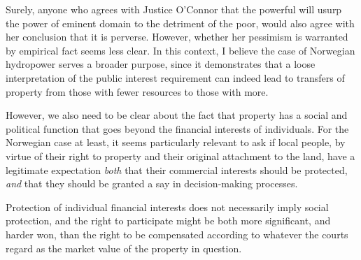{Surely, anyone who agrees with Justice O'Connor that the powerful will usurp the power of eminent domain to the detriment of the poor, would also agree with her conclusion that it is perverse. However, whether her pessimism is warranted by empirical fact seems less clear. In this context, I believe the case of Norwegian hydropower serves a broader purpose, since it demonstrates that a loose interpretation of the public interest requirement can  indeed lead to transfers of property from those with fewer resources to those with more.

However, we also need to be clear about the fact that property has a social and political function that goes beyond the financial interests of individuals. For the Norwegian case at least, it seems particularly relevant to ask if local people, by virtue of their right to property and their original attachment to the land, have a legitimate expectation \emph{both} that their commercial interests should be protected, \emph{and} that they should be granted a say in decision-making processes. 

Protection of individual financial interests does not necessarily imply social protection, and the right to participate might be both more significant, and harder won, than the right to be compensated according to whatever the courts regard as the market value of the property in question.

}
